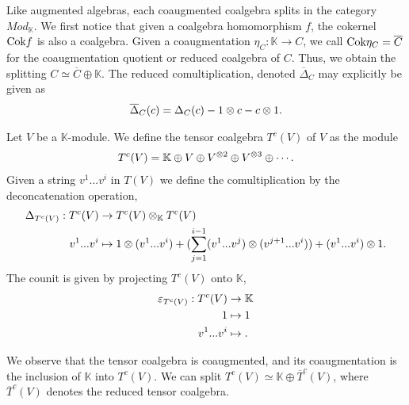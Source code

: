 \documentclass[../thesis.tex]{subfiles}
\begin{document}
            Like augmented algebras, each coaugmented coalgebra splits in the category $Mod_\mathbb{K}$. We first notice that given a coalgebra homomorphism $f$, the cokernel $\tt{Cok}f$ is also a coalgebra. Given a coaugmentation $\eta_C : \mathbb{K} \rightarrow C$, we call $\tt{Cok}\eta_C = \overline{C}$ for the coaugmentation quotient or reduced coalgebra of $C$. Thus, we obtain the splitting $C \simeq \overline{C}\oplus\mathbb{K}$. The reduced comultiplication, denoted $\overline{\Delta}_C$ may explicitly be given as
            \begin{align*}
                \overline{\Delta}_C(c) = \Delta_C(c) - 1\otimes c - c\otimes 1\tt{.}
            \end{align*}

            \begin{example}
                Let $V$ be a $\mathbb{K}$-module. We define the tensor coalgebra $T^c(V)$ of $V$ as the module
                \begin{align*}
                    T^c(V) = \mathbb{K}\oplus V\oplus V^{\otimes 2}\oplus V^{\otimes 3}\oplus \cdots\tt{.}
                \end{align*}
                Given a string $v^1...v^i$ in $T(V)$ we define the comultiplication by the deconcatenation operation,
                \begin{align*}
                    \Delta_{T^c(V)}:T^c(V) & \rightarrow T^c(V)\otimes_{\mathbb{K}}T^c(V) \\
                    v^1...v^i & \mapsto 1\otimes(v^1...v^i) + (\sum_{j=1}^{i-1} (v^1...v^{j})\otimes(v^{j+1}...v^i)) + (v^1...v^i)\otimes 1\tt{.}
                \end{align*}
                The counit is given by projecting $T^c(V)$ onto $\mathbb{K}$,
                \begin{align*}
                    \varepsilon_{T^c(V)} : T^c(V) & \rightarrow \mathbb{K} \\
                    1 & \mapsto 1 \\
                    v^1...v^i & \mapsto \tt{.}
                \end{align*}
            \end{example}

            We observe that the tensor coalgebra is coaugmented, and its coaugmentation is the inclusion of $\mathbb{K}$ into $T^c(V)$. We can split $T^c(V) \simeq \mathbb{K}\oplus \overline{T}^c(V)$, where $\overline{T}^c(V)$ denotes the reduced tensor coalgebra.
\end{document}
